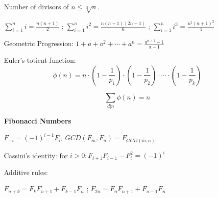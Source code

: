 \documentclass{article}
\title{}
\begin{document}
Number of divisors of $n \le \sqrt[3]{n}$. 

$\sum_{i=1}^{n}{i}=\frac{n(n+1)}{2}$ ;
$\sum_{i=1}^{n}{i^2} = \frac{n(n+1)(2n+1)}{6}$ ;
$\sum_{i=1}^{n}{i^3} = \frac{n^2(n+1)^2}{4}$

Geometric Progression: $1 + a + a^2 + \cdots + a^n = \frac{a^{n + 1} - 1}{a - 1}$

Euler's totient function: 
$$\phi(n) = n \cdot (1 - \frac{1}{p_1}) \cdot (1 - \frac{1}{p_2}) \cdot \cdots \cdot (1 - \frac{1}{p_k})$$

$$\sum_{d|n}{\phi(n) = n}$$

\noindent\textbf{Fibonacci Numbers}

$F_{-i}=(-1)^{i-1}F_i$;
$GCD(F_m,F_n) = F_{GCD(m,n)}$

Cassini's identity: for $i > 0: F_{i+1}F_{i-1}-F_i^2=(-1)^i$

Additive rules:

\begin{center}
	$F_{n+k}=F_{k}F_{n+1} + F_{k-1}F_{n}$ ;
	$F_{2n}=F_{n}F_{n+1}+F_{n-1}F_{n}$
\end{center}
\end{document}
